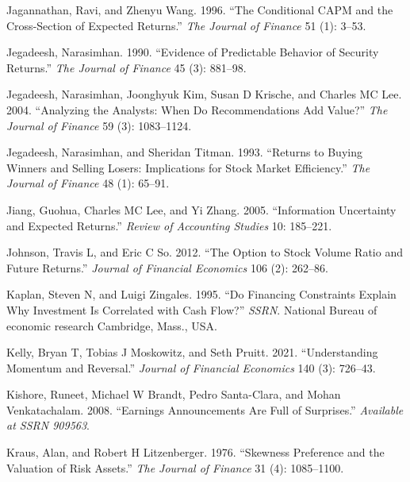 \documentclass[
  letterpaper,
  DIV=11,
  numbers=noendperiod]{scrreprt}
\newlength{\cslhangindent}
\newlength{\cslentryspacingunit} %
\newenvironment{CSLReferences}[2] %
 {%
  \setlength{\parindent}{0pt}
  \ifodd #1
  \let\oldpar\par
  \def\par{\hangindent=\cslhangindent\oldpar}
  \fi
  \setlength{\parskip}{#2\cslentryspacingunit}
 }%
 {}
\begin{document}
\begin{CSLReferences}{1}{0}
\leavevmode{}%
Jagannathan, Ravi, and Zhenyu Wang. 1996. {``The Conditional CAPM and
the Cross-Section of Expected Returns.''} \emph{The Journal of Finance}
51 (1): 3--53.

\leavevmode{}%
Jegadeesh, Narasimhan. 1990. {``Evidence of Predictable Behavior of
Security Returns.''} \emph{The Journal of Finance} 45 (3): 881--98.

\leavevmode{}%
Jegadeesh, Narasimhan, Joonghyuk Kim, Susan D Krische, and Charles MC
Lee. 2004. {``Analyzing the Analysts: When Do Recommendations Add
Value?''} \emph{The Journal of Finance} 59 (3): 1083--1124.

\leavevmode{}%
Jegadeesh, Narasimhan, and Sheridan Titman. 1993. {``Returns to Buying
Winners and Selling Losers: Implications for Stock Market Efficiency.''}
\emph{The Journal of Finance} 48 (1): 65--91.

\leavevmode{}%
Jiang, Guohua, Charles MC Lee, and Yi Zhang. 2005. {``Information
Uncertainty and Expected Returns.''} \emph{Review of Accounting Studies}
10: 185--221.

\leavevmode{}%
Johnson, Travis L, and Eric C So. 2012. {``The Option to Stock Volume
Ratio and Future Returns.''} \emph{Journal of Financial Economics} 106
(2): 262--86.

\leavevmode{}%
Kaplan, Steven N, and Luigi Zingales. 1995. {``Do Financing Constraints
Explain Why Investment Is Correlated with Cash Flow?''} \emph{SSRN}.
National Bureau of economic research Cambridge, Mass., USA.

\leavevmode{}%
Kelly, Bryan T, Tobias J Moskowitz, and Seth Pruitt. 2021.
{``Understanding Momentum and Reversal.''} \emph{Journal of Financial
Economics} 140 (3): 726--43.

\leavevmode{}%
Kishore, Runeet, Michael W Brandt, Pedro Santa-Clara, and Mohan
Venkatachalam. 2008. {``Earnings Announcements Are Full of Surprises.''}
\emph{Available at SSRN 909563}.

\leavevmode{}%
Kraus, Alan, and Robert H Litzenberger. 1976. {``Skewness Preference and
the Valuation of Risk Assets.''} \emph{The Journal of Finance} 31 (4):
1085--1100.


\end{CSLReferences}
\end{document}

